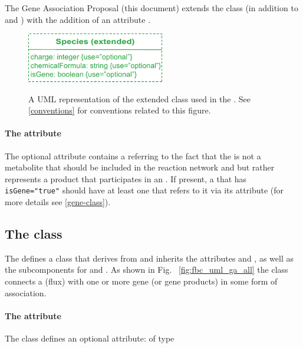 The \FBCPackage \textsf{Gene Association Proposal} (this document) extends the \sbmlthreecore \Species class (in addition to  and ) with the addition of an attribute .
%
\begin{figure}[h!]
  \centering
  \includegraphics[width=6cm]{images/fbc_uml_species-v2.pdf}\\
  \caption{A UML representation of the extended \SBML \Species class used in
  the \FBCPackage. See \ref{conventions} for conventions related to this
  figure.}
  \label{fig:fbc_uml_species_ga}
\end{figure}

\paragraph{The  attribute}
The optional attribute  contains a  referring to the fact that the \Species is not a metabolite that should be included in the reaction network and but rather represents a \Gene product that participates in an \Association. If present, a \Species that has \verb+isGene="true"+ should have at least one \Gene that refers to it via its  attribute (for more details see \ref{gene-class}).
%

\subsection{The \FBC {} class}
\label{geneassociation-class}

The \FBCPackage defines a \GeneAssociation class that derives from \SBase and inherits the attributes  and , as well as the subcomponents for \Annotation and \Notes. As shown in Fig.~ \ref{fig:fbc_uml_ga_all} the \GeneAssociation class connects a \Reaction (flux) with one or more gene (or gene products) in some form of association.

\paragraph{The  attribute}
The \GeneAssociation class defines an optional attribute:  of type 

